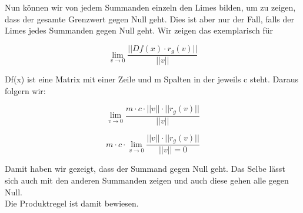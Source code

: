 Nun können wir von jedem Summanden einzeln den Limes bilden, um zu zeigen, dass der gesamte Grenzwert gegen Null geht. Dies ist aber nur der Fall, falls der Limes jedes Summanden gegen Null geht. Wir zeigen das exemplarisch für 

\begin{equation*}
\lim\limits_{v \rightarrow 0} \frac{||Df(x) \cdot r_{g}(v)||}{||v||}
\end{equation*}

Df(x) ist eine Matrix mit einer Zeile und m Spalten in der jeweils c steht. Daraus folgern wir:

\begin{equation*}
\lim\limits_{v \rightarrow 0} \frac{m \cdot c \cdot ||v|| \cdot ||r_{g}(v)||}{||v||}
\end{equation*}

\begin{equation*}
m \cdot c \cdot \lim\limits_{v \rightarrow 0} \frac{ ||v|| \cdot ||r_{g}(v)||}{||v|| = 0}
\end{equation*} 

Damit haben wir gezeigt, dass der Summand gegen Null geht. Das Selbe lässt sich auch mit den anderen Summanden zeigen und auch diese gehen alle gegen Null. \\
Die Produktregel ist damit bewiesen. 













